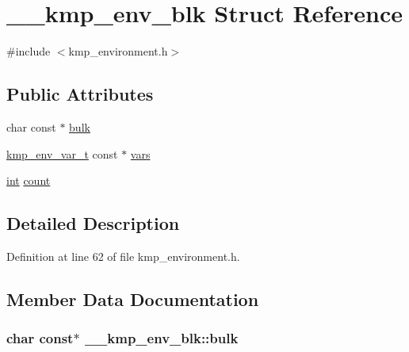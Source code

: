 \hypertarget{struct____kmp__env__blk}{\section{\-\_\-\-\_\-kmp\-\_\-env\-\_\-blk Struct Reference}
\label{struct____kmp__env__blk}
}


{\ttfamily \#include $<$kmp\-\_\-environment.\-h$>$}

\subsection*{Public Attributes}
\begin{DoxyCompactItemize}
\item 
char const $\ast$ \hyperlink{struct____kmp__env__blk_af711e9d15e00ff7c58f5ca691d3bc4dc}{bulk}
\item 
\hyperlink{kmp__environment_8h_a53889221cab0cfddd3d03b701552bf26}{kmp\-\_\-env\-\_\-var\-\_\-t} const $\ast$ \hyperlink{struct____kmp__env__blk_af6ab63dec994b80f1d4029b447b6e435}{vars}
\item 
\hyperlink{ittnotify__static_8h_a8b8dcd723308a8cb5d84277c7a3fff70}{int} \hyperlink{struct____kmp__env__blk_a857a76ec0e363dbd587b0f5f0b57c886}{count}
\end{DoxyCompactItemize}


\subsection{Detailed Description}


Definition at line 62 of file kmp\-\_\-environment.\-h.



\subsection{Member Data Documentation}
\hypertarget{struct____kmp__env__blk_af711e9d15e00ff7c58f5ca691d3bc4dc}{
\subsubsection[{bulk}]{\setlength{\rightskip}{0pt plus 5cm}char const$\ast$ \-\_\-\-\_\-kmp\-\_\-env\-\_\-blk\-::bulk}}\label{struct____kmp__env__blk_af711e9d15e00ff7c58f5ca691d3bc4dc}


